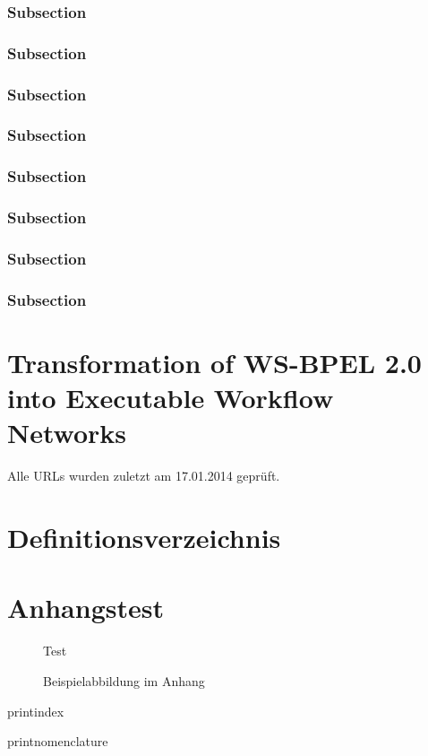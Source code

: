\documentclass[paper=a5,twoside,fontsize=10pt, DIV=calc, headings=small, bibliography=totoc, listof=totoc]{scrbook}
\providecommand{\IfDefined}[2]{%
\ifcsname #1\endcsname
   #2 %
\else
\fi
}
\theoremstyle{break}
\newcommand{\setchapterfooter}[1]{%
	\def\mydummy{#1}
	\renewcommand{\chaptermark}[1]{%
		\markright{\textbf{\thechapter}~|~\mydummy}{}}
}
\newcommand{\resetchapterfooter}{%
 	\renewcommand{\chaptermark}[1]{%
 		\markright{\textbf{\thechapter}~|~##1}{}}
}
\renewcommand{\chaptermark}[1]{%
\markright{\textbf{\thechapter}~|~#1}{}}
\begin{document}
\subsection{Subsection}
\subsection{Subsection}
\subsection{Subsection}
\subsection{Subsection}
\subsection{Subsection}
\subsection{Subsection}
\subsection{Subsection}
\subsection{Subsection}

%
\setchapterfooter{Kleiner Fuß!}
\chapter{Transformation of WS-BPEL 2.0 into Executable Workflow Networks}
\label{chap:bpel-ewfn-transformation}

\blindtext[3]

\resetchapterfooter

\printbibliography
\noindent
Alle URLs wurden zuletzt am 17.01.2014 gepr\"uft.

\clearpage
\listoffigures
\listoftables

\chapter*{Definitionsverzeichnis}

\appendix


\chapter{Anhangstest}

\begin{figure}
Test
\caption{Beispielabbildung im Anhang}
\end{figure}

%

\IfDefined{printindex}{\printindex}
\IfDefined{printnomenclature}{\printnomenclature}
\end{document}
